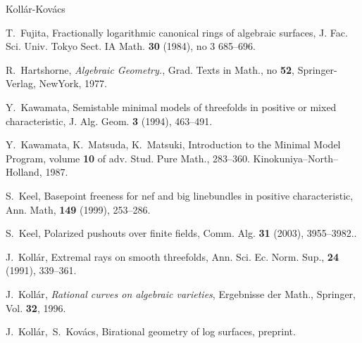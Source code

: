 \documentclass[12pt,twoside]{amsart}
\theoremstyle{definition}
\begin{document}
\begin{thebibliography}{Koll\'ar-Kov\'acs}


{T.~Fujita},
Fractionally logarithmic canonical rings of algebraic surfaces, 
{J. Fac. Sci. Univ. Tokyo Sect. IA Math. {\textbf{30}} (1984), no 3 685--696}.








{R.~Hartshorne},
{\em Algebraic Geometry.},
{Grad. Texts in Math., no {\textbf{52}}, Springer-Verlag, NewYork, 1977}.





{Y.~Kawamata},
Semistable minimal models of threefolds in positive or mixed characteristic,
{J. Alg. Geom. {\textbf{3}} (1994), 463--491}.


{Y.~Kawamata, K.~Matsuda, K.~Matsuki},
Introduction to the Minimal Model Program,
{volume {\textbf{10}} of adv. Stud. Pure Math., 
283--360. Kinokuniya--North--Holland, 1987}.


{S.~Keel},
Basepoint freeness for nef and big linebundles in positive characteristic, 
{Ann. Math, {\textbf{149}} (1999), 253--286}.


{S.~Keel},
Polarized pushouts over finite fields, 
{Comm. Alg. {\textbf{31}} (2003), 3955--3982.}.



{J.~Koll\'ar},
Extremal rays on smooth threefolds, 
{Ann. Sci. Ec. Norm. Sup., {\textbf{24}} (1991), 339--361}.

{J.~Koll\'ar},
{\em Rational curves on algebraic varieties}, 
{Ergebnisse der Math., Springer, Vol. {\textbf{32}}, 1996}.





{J.~Koll\'ar,~S.~Kov\'acs},
Birational geometry of log surfaces, 
{preprint}.



\end{thebibliography}
\end{document}
